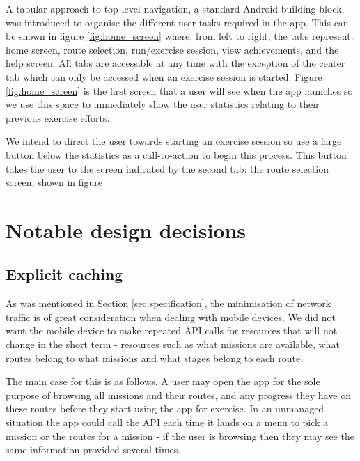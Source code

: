 A tabular approach to top-level navigation, a standard Android building
block\cite{android_tabs}, was introduced to organise the different user
tasks required in the app. This can be shown in figure
\ref{fig:home_screen} where, from left to right, the tabs represent:
home screen, route selection, run/exercise session, view achievements,
and the help screen. All tabs are accessible at any time with the
exception of the center tab which can only be accessed when an
exercise session is started. Figure \ref{fig:home_screen} is the first
screen that a user will see when the app launches so we use this space
to immediately show the user statistics relating to their previous
exercise efforts.

We intend to direct the user towards starting an exercise session so
use a large button below the statistics as a call-to-action to begin
this process. This button takes the user to the screen indicated by
the second tab: the route selection screen, shown in figure



\section{Notable design decisions}\label{sec:notable}
\subsection{Explicit caching}
\label{sec:explicit_caching}
As was mentioned in Section \ref{sec:specification}, the minimisation of network
traffic is of great consideration when dealing with mobile devices. We
did not want the mobile device to make repeated API calls for
resources that will not change in the short term - resources such as
what missions are available, what routes belong to what missions and
what stages belong to each route. 

The main case for this is as follows. A user may open the app for the
sole purpose of browsing all missions and their routes, and any
progress they have on these routes before they start using the app for
exercise. In an unmanaged situation the app could call the API each
time it lands on a menu to pick a mission or the routes for a mission
- if the user is browsing then they may see the same information
provided several times. 

